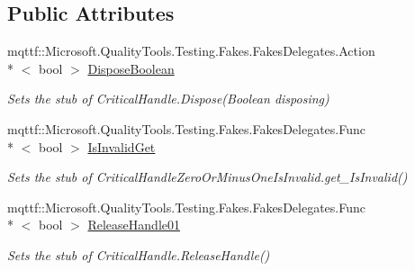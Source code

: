 \subsection*{Public Attributes}
\begin{DoxyCompactItemize}
\item 
mqttf\-::\-Microsoft.\-Quality\-Tools.\-Testing.\-Fakes.\-Fakes\-Delegates.\-Action\\*
$<$ bool $>$ \hyperlink{class_microsoft_1_1_win32_1_1_safe_handles_1_1_fakes_1_1_stub_critical_handle_zero_or_minus_one_is_invalid_aeb363c0be45e40910343f074368523de}{Dispose\-Boolean}
\begin{DoxyCompactList}\small\item\em Sets the stub of Critical\-Handle.\-Dispose(\-Boolean disposing)\end{DoxyCompactList}\item 
mqttf\-::\-Microsoft.\-Quality\-Tools.\-Testing.\-Fakes.\-Fakes\-Delegates.\-Func\\*
$<$ bool $>$ \hyperlink{class_microsoft_1_1_win32_1_1_safe_handles_1_1_fakes_1_1_stub_critical_handle_zero_or_minus_one_is_invalid_aeea852777f80d9472c3d7b8824a1fb3e}{Is\-Invalid\-Get}
\begin{DoxyCompactList}\small\item\em Sets the stub of Critical\-Handle\-Zero\-Or\-Minus\-One\-Is\-Invalid.\-get\-\_\-\-Is\-Invalid()\end{DoxyCompactList}\item 
mqttf\-::\-Microsoft.\-Quality\-Tools.\-Testing.\-Fakes.\-Fakes\-Delegates.\-Func\\*
$<$ bool $>$ \hyperlink{class_microsoft_1_1_win32_1_1_safe_handles_1_1_fakes_1_1_stub_critical_handle_zero_or_minus_one_is_invalid_a85f540887b3c9695e83a30348234d63e}{Release\-Handle01}
\begin{DoxyCompactList}\small\item\em Sets the stub of Critical\-Handle.\-Release\-Handle()\end{DoxyCompactList}\end{DoxyCompactItemize}
